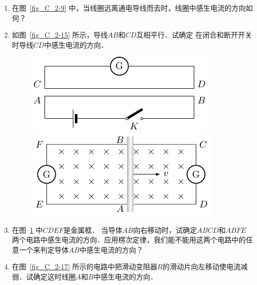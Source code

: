 \begin{enumerate}
    \item 在图~\ref{fig_C_2-9} 中，当线圈远离通电导线而去时，线圈中感生电流的方向如何？
    \item 如图~\ref{fig_C_2-15} 所示，导线$AB$和$CD$互相平行．试确定
    在闭合和断开开关时导线$CD$中感生电流的方向．
    \begin{figure}[htbp]
    	\centering
    	\begin{minipage}[t]{0.48\textwidth}
    		\centering
    		\includegraphics{fig/C/2-15.pdf}
    		\caption{}\label{fig_C_2-15}
    	\end{minipage}
    	\begin{minipage}[t]{0.48\textwidth}
    		\centering
    		\includegraphics{fig/C/2-16.pdf}
    		\caption{}\label{fig_C_2-16}
    	\end{minipage}
    \end{figure}
    
    
    
  \item 在图~\ref{fig_C_2-16} 中$CDEF$是金属框．
  当导体$AB$向右移动时，试确定$ABCD$和$ABFE$ 两个电路中感生电流的方向．应用楞次定律，我们能不能用这两个电路中的任意一个来判定导体$AB$中感生电流的方向？
  
  \item 在图~\ref{fig_C_2-17} 所示的电路中把滑动变阻器$R$的滑动片向左移动使电流减弱．试确定这时线圈$A$和$B$中感生电流的方向．
  

\end{enumerate}
